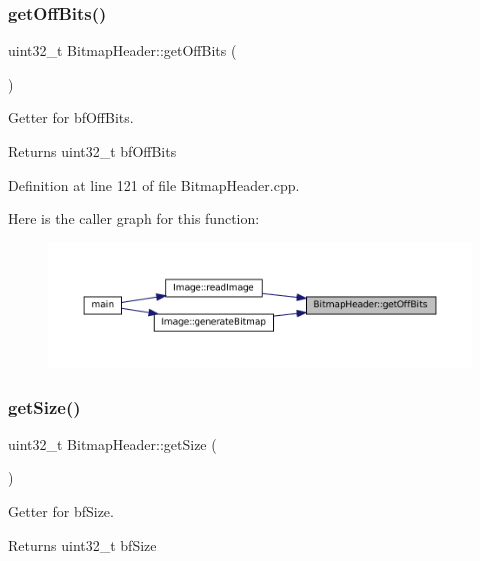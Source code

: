 \subsubsection{\texorpdfstring{getOffBits()}{getOffBits()}}
{\footnotesize\ttfamily uint32\+\_\+t Bitmap\+Header\+::get\+Off\+Bits (\begin{DoxyParamCaption}{ }\end{DoxyParamCaption})}



Getter for bf\+Off\+Bits. 

\begin{DoxyReturn}{Returns}
uint32\+\_\+t bf\+Off\+Bits 
\end{DoxyReturn}


Definition at line 121 of file Bitmap\+Header.\+cpp.

Here is the caller graph for this function\+:
\nopagebreak
\begin{figure}[H]
\begin{center}
\leavevmode
\includegraphics[width=350pt]{classBitmapHeader_a70702e4d8aba2a3502f776f73bfecde8_icgraph}
\end{center}
\end{figure}
\mbox{\label{classBitmapHeader_a53309aa035484da90e8170f9950aa86b}} 
\subsubsection{\texorpdfstring{getSize()}{getSize()}}
{\footnotesize\ttfamily uint32\+\_\+t Bitmap\+Header\+::get\+Size (\begin{DoxyParamCaption}{ }\end{DoxyParamCaption})}



Getter for bf\+Size. 

\begin{DoxyReturn}{Returns}
uint32\+\_\+t bf\+Size 
\end{DoxyReturn}


